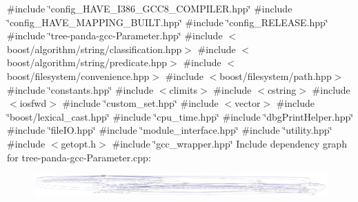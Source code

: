 {\ttfamily \#include \char`\"{}config\+\_\+\+H\+A\+V\+E\+\_\+\+I386\+\_\+\+G\+C\+C8\+\_\+\+C\+O\+M\+P\+I\+L\+E\+R.\+hpp\char`\"{}}\newline
{\ttfamily \#include \char`\"{}config\+\_\+\+H\+A\+V\+E\+\_\+\+M\+A\+P\+P\+I\+N\+G\+\_\+\+B\+U\+I\+L\+T.\+hpp\char`\"{}}\newline
{\ttfamily \#include \char`\"{}config\+\_\+\+R\+E\+L\+E\+A\+S\+E.\+hpp\char`\"{}}\newline
{\ttfamily \#include \char`\"{}tree-\/panda-\/gcc-\/\+Parameter.\+hpp\char`\"{}}\newline
{\ttfamily \#include $<$boost/algorithm/string/classification.\+hpp$>$}\newline
{\ttfamily \#include $<$boost/algorithm/string/predicate.\+hpp$>$}\newline
{\ttfamily \#include $<$boost/filesystem/convenience.\+hpp$>$}\newline
{\ttfamily \#include $<$boost/filesystem/path.\+hpp$>$}\newline
{\ttfamily \#include \char`\"{}constants.\+hpp\char`\"{}}\newline
{\ttfamily \#include $<$climits$>$}\newline
{\ttfamily \#include $<$cstring$>$}\newline
{\ttfamily \#include $<$iosfwd$>$}\newline
{\ttfamily \#include \char`\"{}custom\+\_\+set.\+hpp\char`\"{}}\newline
{\ttfamily \#include $<$vector$>$}\newline
{\ttfamily \#include \char`\"{}boost/lexical\+\_\+cast.\+hpp\char`\"{}}\newline
{\ttfamily \#include \char`\"{}cpu\+\_\+time.\+hpp\char`\"{}}\newline
{\ttfamily \#include \char`\"{}dbg\+Print\+Helper.\+hpp\char`\"{}}\newline
{\ttfamily \#include \char`\"{}file\+I\+O.\+hpp\char`\"{}}\newline
{\ttfamily \#include \char`\"{}module\+\_\+interface.\+hpp\char`\"{}}\newline
{\ttfamily \#include \char`\"{}utility.\+hpp\char`\"{}}\newline
{\ttfamily \#include $<$getopt.\+h$>$}\newline
{\ttfamily \#include \char`\"{}gcc\+\_\+wrapper.\+hpp\char`\"{}}\newline
Include dependency graph for tree-\/panda-\/gcc-\/\+Parameter.cpp\+:
\nopagebreak
\begin{figure}[H]
\begin{center}
\leavevmode
\includegraphics[width=350pt]{df/ddd/tree-panda-gcc-Parameter_8cpp__incl}
\end{center}
\end{figure}
